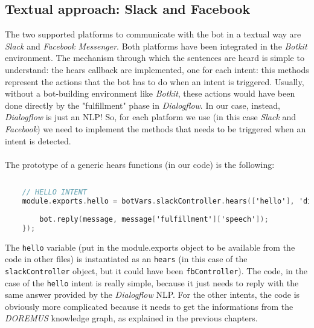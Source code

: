 	\subsection{Textual approach: Slack and Facebook}
	The two supported platforms to communicate with the bot in a textual way are \textit{Slack} and \textit{Facebook Messenger}. Both platforms have been integrated in the \textit{Botkit} environment. The mechanism through which the sentences are heard is simple to understand: the hears callback are implemented, one for each intent: this methods represent the actions that the bot has to do when an intent is triggered. Usually, without a bot-building environment like \textit{Botkit}, these actions would have been done directly by the "fulfillment" phase in \textit{Dialogflow}. In our case, instead, \textit{Dialogflow} is just an NLP! So, for each platform we use (in this case \textit{Slack} and \textit{Facebook}) we need to implement the methods that needs to be triggered when an intent is detected.\\\\
	The prototype of a generic hears functions (in our code) is the following:
	\begin{lstlisting}[language=C]
	
	// HELLO INTENT
	module.exports.hello = botVars.slackController.hears(['hello'], 'direct_message, direct_mention, mention', botVars.dialogflowMiddleware.hears, function(bot, message) {
	
		bot.reply(message, message['fulfillment']['speech']);
	});
	\end{lstlisting}
	The \texttt{hello} variable (put in the module.exports object to be available from the code in other files) is instantiated as an \texttt{hears} (in this case of the \texttt{slackController} object, but it could have been \texttt{fbController}). The code, in the case of the \texttt{hello} intent is really simple, because it just needs to reply with the same answer provided by the \textit{Dialogflow} NLP. For the other intents, the code is obviously more complicated because it needs to get the informations from the \textit{DOREMUS} knowledge graph, as explained in the previous chapters.\\\\
	
